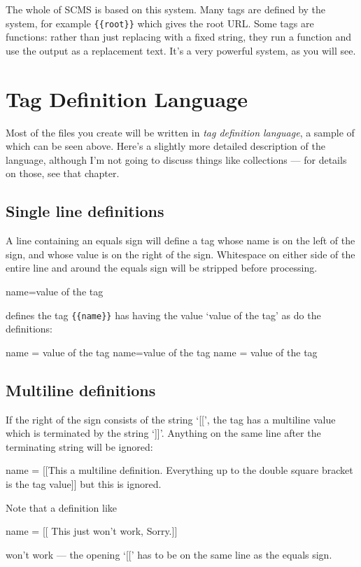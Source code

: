 The whole of SCMS is based on this system. Many tags are defined by the
system, for example \texttt{\{\{root\}\}} which gives the root URL. Some tags
are functions: rather than just replacing with a fixed string, they run a
function and use the output as a replacement text. It's a very powerful
system, as you will see.

\section{Tag Definition Language} 
Most of the files you create will be written in \emph{tag
definition language}, a sample of which can be seen above. Here's a slightly
more detailed description of the language, although I'm not going to discuss
things like collections --- for details on those, see that chapter.

\subsection{Single line definitions}
A line containing an equals sign will define a tag whose name is on the left
of the sign, and whose value is on the right of the sign. Whitespace on either
side of the entire line and around the equals sign will be stripped before
processing.
\begin{MyVerbatim}
name=value of the tag
\end{MyVerbatim}
defines the tag \texttt{\{\{name\}\}} has having the value `value of the tag' as do
the definitions:
\begin{MyVerbatim}
name  = value of the tag
      name=value of the tag
                 name =    value of the tag
\end{MyVerbatim}

\clearpage
\subsection{Multiline definitions}
If the right of the sign consists of the string `[[', the tag has a multiline
value which is terminated by the string `]]'. Anything on the same line after
the terminating string will be ignored:
\begin{MyVerbatim}
name = [[This a multiline definition. Everything up to the
double square bracket is the tag value]] but this is ignored.
\end{MyVerbatim}
Note that a definition like
\begin{MyVerbatim}
name =
[[ This just won't work,
Sorry.]]
\end{MyVerbatim}
won't work --- the opening `[[' has to be on the same line as the equals sign.


